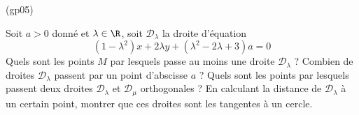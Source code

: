 \begin{tiny}(gp05)\end{tiny}
Soit $a>0$ donn{\'e} et $\lambda \in \R$, soit $\mathcal{D}_{\lambda }$ la droite d'{\'e}quation
\[
(1-\lambda ^{2})x+2\lambda y+(\lambda ^{2}-2\lambda +3)a=0
\]
Quels sont les points $M$ par lesquels passe au moins une droite $\mathcal{D}_{\lambda }$ ? Combien de droites $\mathcal D_\lambda$ passent par un point d'abscisse $a$ ? Quels sont les points par lesquels passent deux droites $\mathcal{D}_{\lambda }$  et $\mathcal{D}_{\mu}$ orthogonales ? En calculant la distance de $\mathcal D_\lambda$ à un certain point, montrer que ces droites sont les tangentes à un cercle.
